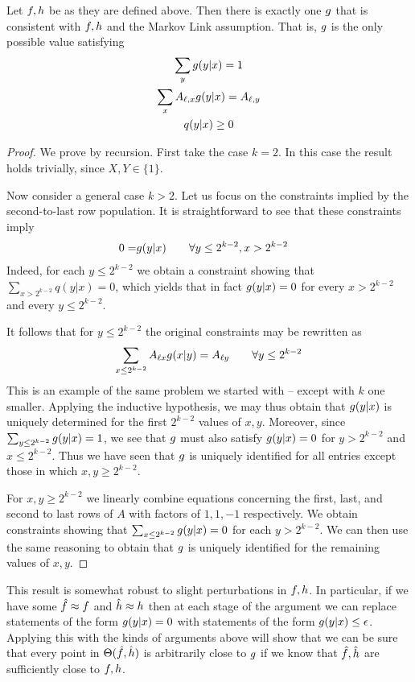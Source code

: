 \begin{thm}\label{thm:miracle}
Let $f,h$ be as they are defined above.  Then there is exactly one $g$ that is consistent with $f,h$ and the Markov Link assumption.  That is, $g$ is the only possible value satisfying
\begin{gather*}
\sum_y g(y|x)=1 \\
\sum_x A_{\ell,x}g(y|x)=A_{\ell,y}\\
q(y|x)\geq 0
\end{gather*}
\end{thm} 
\begin{proof}
We prove by recursion.  First take the case $k=2$.  In this case the result holds trivially, since $X,Y\in\{1\}$.

Now consider a general case $k>2$.  Let us focus on the constraints implied by the second-to-last row population.  It is straightforward to see that these constraints imply
\begin{align*}
0=&g(y|x) \qquad \forall y\leq 2^{k-2},x>2^{k-2}
\end{align*}
Indeed, for each $y\leq 2^{k-2}$ we obtain a constraint showing that $\sum_{x>2^{k-2}}q(y|x)=0$, which yields that in fact $g(y|x)=0$ for every $x>2^{k-2}$ and every $y\leq 2^{k-2}$.

It follows that for $y\leq 2^{k-2}$ the original constraints may be rewritten as
\[
\sum_{x\leq2^{k-2}} A_{\ell x} g(x|y) = A_{\ell y} \qquad \forall y\leq 2^{k-2}
\]
This is an example of the same problem we started with -- except with $k$ one smaller.  Applying the inductive hypothesis, we may thus obtain that $g(y|x)$ is uniquely determined for the first $2^{k-2}$ values of $x,y$.  Moreover, since $\sum_{y\leq 2^{k-2}} g(y|x)=1$, we see that $g$ must also satisfy $g(y|x)=0$ for $y>2^{k-2}$ and $x\leq 2^{k-2}$.  Thus we have seen that $g$ is uniquely identified for all entries except those in which $x,y\geq 2^{k-2}$.

For $x,y \geq2^{k-2}$ we linearly combine equations concerning the first, last, and second to last rows of $A$ with factors of $1,1,-1$ respectively.  We obtain constraints showing that $\sum_{x\leq2^{k-2}}g(y|x)=0$ for each $y>2^{k-2}$.  We can then use the same reasoning to obtain that $g$ is uniquely identified for the remaining values of $x,y$.
\end{proof}

This result is somewhat robust to slight perturbations in $f,h$.  In particular, if we have some $\hat {f}\approx f$ and $\hat {h}\approx h$ then at each stage of the argument we can replace statements of the form $g(y|x)=0$ with statements of the form $g(y|x)\leq \epsilon$.  Applying this with the kinds of arguments above will show that we can be sure that every point in $\Theta(\hat {f},\hat {h})$ is arbitrarily close to $g$ if we know that $\hat {f},\hat {h}$ are sufficiently close to $f,h$.  

